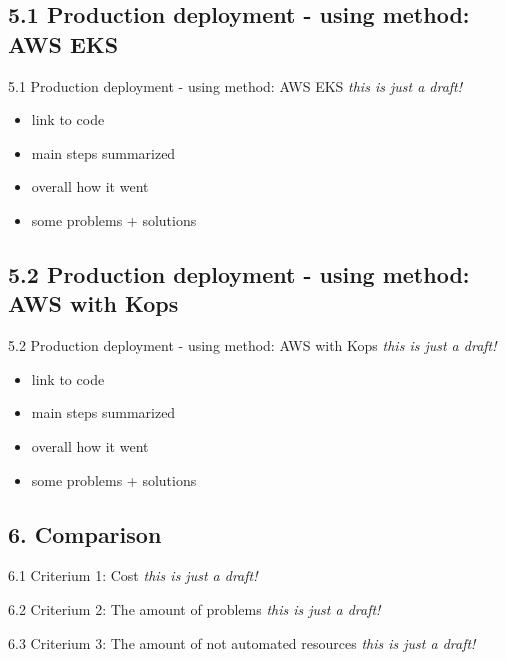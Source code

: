 \documentclass{beamer}
\begin{document}
\subsection{5.1 Production deployment - using method: AWS EKS}
\begin{frame}{5.1 Production deployment - using method: AWS EKS}%
\textit{this is just a draft!}
\begin{itemize}
	\item link to code
	\item main steps summarized
	\item overall how it went
	\item some problems + solutions 
\end{itemize}
\end{frame}

\subsection{5.2 Production deployment - using method: AWS with Kops}
\begin{frame}{5.2 Production deployment - using method: AWS with Kops}%
\textit{this is just a draft!}
\begin{itemize}
	\item link to code
	\item main steps summarized
	\item overall how it went
	\item some problems + solutions 
\end{itemize}
\end{frame}

\subsection{6. Comparison}
\begin{frame}{6.1 Criterium 1: Cost}%
\textit{this is just a draft!}

\end{frame}

\begin{frame}{6.2 Criterium 2: The amount of problems}%
\textit{this is just a draft!}

\end{frame}

\begin{frame}{6.3 Criterium 3: The amount of not automated resources}%
\textit{this is just a draft!}

\end{frame}
\end{document}
